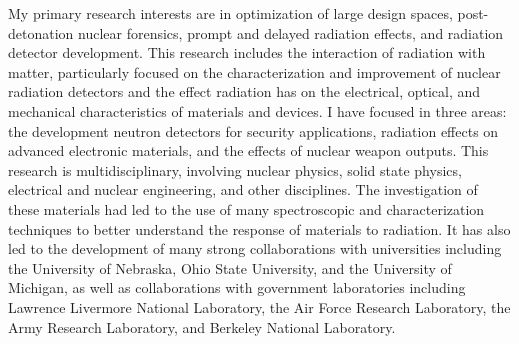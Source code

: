 My primary research interests are in optimization of large design spaces, post-detonation nuclear forensics, prompt and delayed radiation effects, and radiation detector development. This research includes the interaction of radiation with matter, particularly focused on the characterization and improvement of nuclear radiation detectors and the effect radiation has on the electrical, optical, and mechanical characteristics of materials and devices. I have focused in three areas: the development neutron detectors for security applications, radiation effects on advanced electronic materials, and the effects of nuclear weapon outputs.
This research is multidisciplinary, involving nuclear physics, solid state physics, electrical and nuclear engineering, and other disciplines. The investigation of these materials had led to the use of many spectroscopic and characterization techniques to better understand the response of materials to radiation. It has also led to the development of many strong collaborations with universities including the University of Nebraska, Ohio State University, and the University of Michigan, as well as collaborations with government laboratories including Lawrence Livermore National Laboratory, the Air Force Research Laboratory, the Army Research Laboratory, and Berkeley National Laboratory. 
